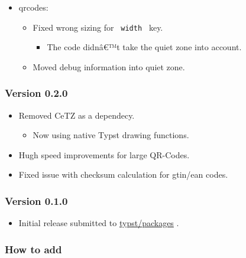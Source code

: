 \begin{itemize}
\tightlist
\item
  qrcodes:

  \begin{itemize}
  \tightlist
  \item
    Fixed wrong sizing for \texttt{\ width\ } key.

    \begin{itemize}
    \tightlist
    \item
      The code didnâ€™t take the quiet zone into account.
    \end{itemize}
  \item
    Moved debug information into quiet zone.
  \end{itemize}
\end{itemize}

\subsubsection{Version 0.2.0}\label{version-0.2.0}

\begin{itemize}
\tightlist
\item
  Removed CeTZ as a dependecy.

  \begin{itemize}
  \tightlist
  \item
    Now using native Typst drawing functions.
  \end{itemize}
\item
  Hugh speed improvements for large QR-Codes.
\item
  Fixed issue with checksum calculation for gtin/ean codes.
\end{itemize}

\subsubsection{Version 0.1.0}\label{version-0.1.0}

\begin{itemize}
\tightlist
\item
  Initial release submitted to
  \href{https://github.com/typst/packages}{typst/packages} .
\end{itemize}

\subsubsection{How to add}\label{how-to-add}


